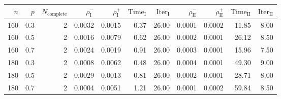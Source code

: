 \begin{tabular}{rrr rrrrrrrr}
\toprule
$n$ & $p$ & $N_{\mathrm{complete}}$ & $\rho^-_{\mathrm I}$ & $\rho^+_{\mathrm I}$ & $\mathrm{Time}_{\mathrm I}$ & $\mathrm{Iter}_{\mathrm I}$ & $\rho^-_{\mathrm{II}}$ & $\rho^+_{\mathrm{II}}$ & $\mathrm{Time}_{\mathrm{II}}$ & $\mathrm{Iter}_{\mathrm{II}}$ \\
\midrule
160 & 0.3 & 2 & 0.0032 & 0.0015 & 0.37 & 26.00 & 0.0001 & 0.0002 & 11.85 & 8.00 \\
160 & 0.5 & 2 & 0.0016 & 0.0079 & 0.62 & 26.00 & 0.0002 & 0.0001 & 26.12 & 8.50 \\
160 & 0.7 & 2 & 0.0024 & 0.0019 & 0.91 & 26.00 & 0.0003 & 0.0001 & 15.96 & 7.50 \\
180 & 0.3 & 2 & 0.0008 & 0.0062 & 0.48 & 26.00 & 0.0004 & 0.0001 & 49.30 & 9.00 \\
180 & 0.5 & 2 & 0.0029 & 0.0013 & 0.81 & 26.00 & 0.0002 & 0.0001 & 28.71 & 8.00 \\
180 & 0.7 & 2 & 0.0004 & 0.0051 & 1.21 & 26.00 & 0.0001 & 0.0002 & 59.84 & 8.50 \\
\bottomrule
\end{tabular}
